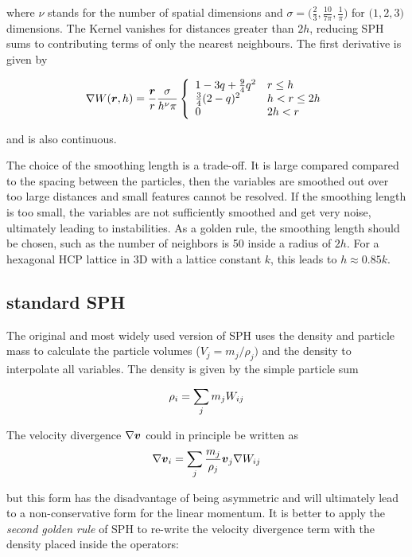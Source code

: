 where $\nu$ stands for the number of spatial dimensions and $\sigma = \big( \frac{2}{3}, \frac{10}{7\pi}, \frac{1}{\pi} \big) $ for $\big( 1,2,3\big)$ dimensions. The Kernel vanishes for distances greater than $2h$, reducing SPH sums to contributing terms of only the nearest neighbours. The first derivative is given by 

\begin{equation}
\label{ch02_sph01_eq008}
\nabla W(\boldsymbol{r}, h) = \frac{\boldsymbol{r}}{r} \frac{\sigma}{h^\nu \pi} \left \{ \begin{array}{ll}
1 - 3q + \frac{9}{4}q^2 & r \leq h \\
\frac{3}{4}(2-q)^2 & h < r  \leq 2h \\
0 & 2h < r \\
\end{array} \right. 
\end{equation}

and is also continuous. 

The choice of the smoothing length is a trade-off. It is large compared compared to the spacing between the particles, then the variables are smoothed out over too large distances and small features cannot be resolved. If the smoothing length is too small, the variables are not sufficiently smoothed and get very noise, ultimately leading to instabilities. As a golden rule, the smoothing length should be chosen, such as the number of neighbors is 50 inside a radius of $2h$. For a hexagonal HCP lattice in 3D with a lattice constant $k$, this leads to $h \approx 0.85 k$. 

\subsection{standard SPH}
The original and most widely used version of SPH uses the density and particle mass to calculate the particle volumes ($V_j = m_j / \rho_j)$ and the density to interpolate all variables. The density is given by the simple particle sum

\begin{equation}
\label{ch02_sph02_eq001}
\rho_i = \sum_{j} m_j W_{ij}
\end{equation}

The velocity divergence $\nabla \boldsymbol{v}$ could in principle be written as
\begin{equation}
\label{ch02_sph02_eq002}
\nabla \boldsymbol{v}_i = \sum_{j} \frac{m_j}{\rho_j} \boldsymbol{v}_j \nabla W_{ij}
\end{equation}

but this form has the disadvantage of being asymmetric and will ultimately lead to a non-conservative form for the linear momentum. It is better to apply the \emph{second golden rule} of SPH \citep{Monaghan:1992p3721} to re-write the velocity divergence term with the density placed inside the operators:

